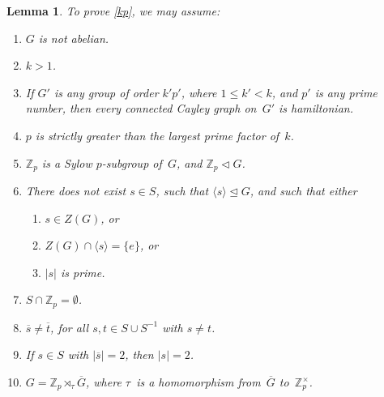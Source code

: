 \documentclass[]{amcjoucc}
\theoremstyle{plain}
\newtheorem{lem}[equation]{Lemma}
\theoremstyle{definition}
\theoremstyle{definition}
\newcommand{\quot}{\overline}
\newcommand{\ZZ}{\mathbb{Z}}
\newcommand{\normal}{\triangleleft}
\newcommand{\normaleq}{\trianglelefteq}
\begin{document}
 \begin{lem} \label{CanAssume}
 To prove \cref{kp}, we may assume:
 	\begin{enumerate}
	
	\item \label{CanAssume-nonabel}
	$G$ is not abelian.
	
	\item \label{CanAssume-k>1}
	$k > 1$.
	
	\item \label{CanAssume-k'}
	If $G'$ is any group of order $k' p'$, where $1 \le k' < k$, and $p'$ is any prime number, then every connected Cayley graph on~$G'$ is hamiltonian.
	
	\item \label{CanAssume-p>k}
	$p$ is strictly greater than the largest prime factor of~$k$.
	
	\item \label{CanAssume-Zp}
	$\ZZ_p$ is a Sylow $p$-subgroup of~$G$, and $\ZZ_p \normal G$. 
	
	
	\item \label{CanAssume-sNotNormal}
 	There does not exist $s \in S$, such that $\langle s \rangle
\normaleq G$, and such that either
         \begin{enumerate}
         \item \label{CanAssume-sNotNormal-Z} 
         $s \in Z(G)$,
         or
         \item \label{CanAssume-sNotNormal-notZ} 
         $Z(G) \cap \langle s \rangle = \{e\}$,
         or
         \item \label{CanAssume-sNotNormal-p}
         $|s|$ is prime.
         \end{enumerate}
         
	\item \label{CanAssume-notZp}
	$S \cap \ZZ_p = \emptyset$.
	
	\item \label{CanAssume-DoubleEdge}
	$\quot s \neq \quot t$, for all $s,t \in S \cup S^{-1}$ with $s \neq t$.
	
	\item \label{CanAssume-DoubleOrder2}
	If $s \in S$ with $|\quot s| = 2$, then $|s| = 2$.
	
	\item \label{CanAssume-semiprod}
	$G = \ZZ_p \rtimes_\tau \quot G$, where $\tau$~is a homomorphism from~$\quot G$ to~$ \ZZ_p^\times$.

	\end{enumerate}
\end{lem}
\end{document}
